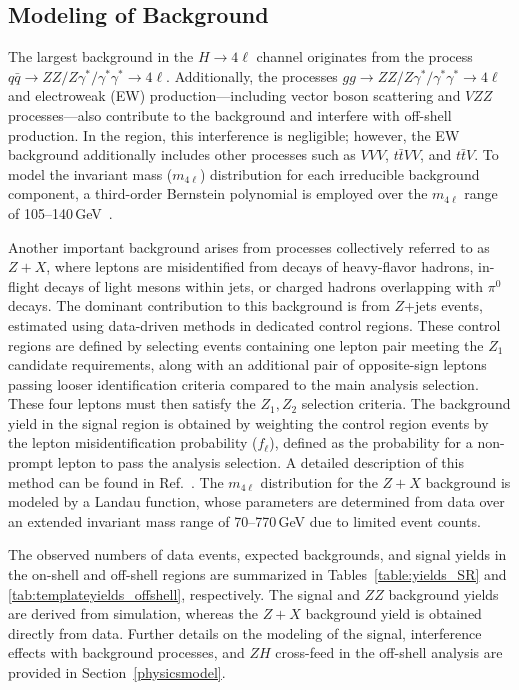 \subsection{Modeling of Background}

The largest background in the $H \to 4\ell$ channel originates from the process $q\bar{q} \to ZZ/Z\gamma^*/\gamma^*\gamma^* \to 4\ell$. Additionally, the processes $gg \to ZZ/Z\gamma^*/\gamma^*\gamma^* \to 4\ell$ and electroweak (EW) production---including vector boson scattering and $VZZ$ processes---also contribute to the background and interfere with off-shell \Hboson production. In the \onshell region, this interference is negligible; however, the EW background additionally includes other processes such as $VVV$, $t\bar{t}VV$, and $t\bar{t}V$. To model the invariant mass ($m_{4\ell}$) distribution for each irreducible background component, a third-order Bernstein polynomial is employed over the $m_{4\ell}$ range of 105--140\,GeV~\cite{PhysRevD.111.092014}.

Another important background arises from processes collectively referred to as $Z+X$, where leptons are misidentified from decays of heavy-flavor hadrons, in-flight decays of light mesons within jets, or charged hadrons overlapping with $\pi^0$ decays. The dominant contribution to this background is from $Z$+jets events, estimated using data-driven methods in dedicated control regions. These control regions are defined by selecting events containing one lepton pair meeting the ${Z}_{1}$ candidate requirements, along with an additional pair of opposite-sign leptons passing looser identification criteria compared to the main analysis selection. These four leptons must then satisfy the ${Z}_{1}, {Z}_{2}$ selection criteria. The background yield in the signal region is obtained by weighting the control region events by the lepton misidentification probability ($f_{\ell}$), defined as the probability for a non-prompt lepton to pass the analysis selection. A detailed description of this method can be found in Ref.~\cite{Sirunyan:2017exp}. The $m_{4\ell}$ distribution for the $Z+X$ background is modeled by a Landau function, whose parameters are determined from data over an extended invariant mass range of 70--770\,GeV due to limited event counts.

The observed numbers of data events, expected backgrounds, and signal yields in the on-shell and off-shell regions are summarized in Tables~\ref{table:yields_SR} and \ref{tab:templateyields_offshell}, respectively. The signal and $ZZ$ background yields are derived from simulation, whereas the $Z+X$ background yield is obtained directly from data. Further details on the modeling of the \Hboson signal, interference effects with background processes, and $ZH$ cross-feed in the off-shell analysis are provided in Section~\ref{physicsmodel}.

